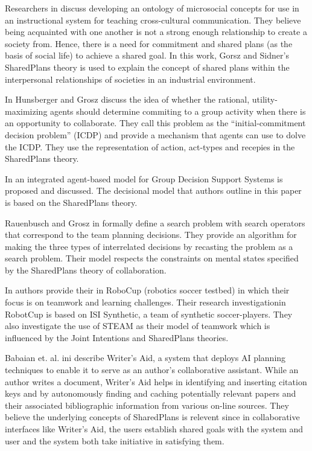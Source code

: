 \documentclass[11pt]{article}
\begin{document}
Researchers in \cite{hobbs:microsociology-relationship} discuss developing an
ontology of microsocial concepts for use in an instructional system for teaching
cross-cultural communication. They believe being acquainted with one another is
not a strong enough relationship to create a society from. Hence, there is a
need for commitment and shared plans (as the basis of social life) to achieve a
shared goal. In this work, Gorsz and Sidner's SharedPlans theory
\cite{grosz:plans-discourse} is used to explain the concept of shared plans
within the interpersonal relationships of societies in an industrial
environment.

In \cite{hunsberger:auction-collaborative} Hunsberger and Grosz discuss the idea
of whether the rational, utility-maximizing agents should determine commiting to
a group activity when there is an opportunity to collaborate. They call this
problem as the ``initial-commitment decision problem'' (ICDP) and provide a
mechanism that agents can use to dolve the ICDP. They use the representation of
action, act-types and recepies in the SharedPlans theory.

In \cite{zamfirescu:gdss} an integrated agent-based model for Group Decision
Support Systems is proposed and discussed. The decisional model that authors
outline in this paper is based on the SharedPlans theory.

Rauenbusch and Grosz in \cite{rauenbusch:decision-making-planning} formally
define a search problem with search operators that correspond to the team
planning decisions. They provide an algorithm for making the three types of
interrelated decisions by recasting the problem as a search problem. Their model
respects the constraints on mental states specified by the SharedPlans theory of
collaboration.

In \cite{marsella:robocup} authors provide their in RoboCup (robotics soccer
testbed) in which their focus is on teamwork and learning challenges. Their
research investigationin RobotCup is based on ISI Synthetic, a team of synthetic
soccer-players. They also investigate the use of STEAM as their model of
teamwork which is influenced by the Joint Intentions and SharedPlans theories.

Babaian et. al. ini \cite{babaian:writers-assistant} describe Writer’s Aid, a
system that deploys AI planning techniques to enable it to serve as an author’s
collaborative assistant. While an author writes a document, Writer’s Aid helps
in identifying and inserting citation keys and by autonomously finding and
caching potentially relevant papers and their associated bibliographic
information from various on-line sources. They believe the underlying concepts
of SharedPlans is relevent since in collaborative interfaces like Writer’s Aid,
the users establish shared goals with the system and user and the system
both take initiative in satisfying them.
\end{document}
